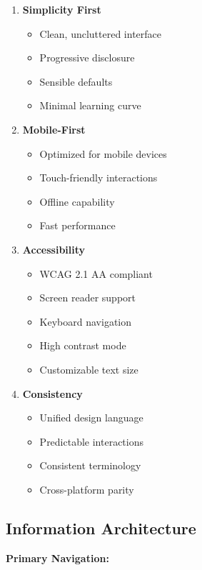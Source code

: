 \begin{enumerate}
    \item \textbf{Simplicity First}
    \begin{itemize}
        \item Clean, uncluttered interface
        \item Progressive disclosure
        \item Sensible defaults
        \item Minimal learning curve
    \end{itemize}
    
    \item \textbf{Mobile-First}
    \begin{itemize}
        \item Optimized for mobile devices
        \item Touch-friendly interactions
        \item Offline capability
        \item Fast performance
    \end{itemize}
    
    \item \textbf{Accessibility}
    \begin{itemize}
        \item WCAG 2.1 AA compliant
        \item Screen reader support
        \item Keyboard navigation
        \item High contrast mode
        \item Customizable text size
    \end{itemize}
    
    \item \textbf{Consistency}
    \begin{itemize}
        \item Unified design language
        \item Predictable interactions
        \item Consistent terminology
        \item Cross-platform parity
    \end{itemize}
\end{enumerate}

\subsection{Information Architecture}

\textbf{Primary Navigation:}

